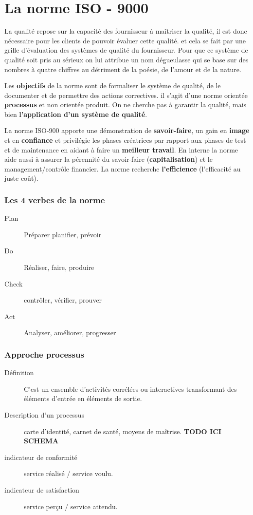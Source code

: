﻿\part{La norme ISO - 9000}

La qualité repose sur la capacité des fournisseur à maîtriser la qualité, il est donc nécessaire pour les clients de pouvoir évaluer cette qualité. et cela se fait par une grille d’évaluation des systèmes de qualité du fournisseur. Pour que ce système de qualité soit pris au sérieux on lui attribue un nom dégueulasse qui se base sur des nombres à quatre chiffres au détriment de la poésie, de l’amour et de la nature.

Les \textbf{objectifs} de la norme sont de formaliser le système de qualité, de le documenter et de permettre des  actions correctives. il s’agit d’une norme orientée \textbf{processus} et non orientée produit. On ne cherche pas à garantir la qualité, mais bien \textbf{l’application d’un système de qualité}.

La norme ISO-900 apporte une démonstration de \textbf{savoir-faire}, un gain en \textbf{image} et en \textbf{confiance} et privilégie les phases créatrices par rapport aux phases de test et de maintenance en aidant à faire un \textbf{meilleur travail}. En interne la norme aide aussi à assurer la pérennité du savoir-faire (\textbf{capitalisation}) et le management/contrôle financier. La norme recherche \textbf{l’efficience} (l'efficacité au juste coût).

\section{Les 4 verbes de la norme}
\begin{description}
	\item[Plan] Préparer planifier, prévoir
	\item[Do] Réaliser, faire, produire
	\item[Check] contrôler, vérifier, prouver
	\item[Act] Analyser, améliorer, progresser
\end{description}



\section{Approche processus}
\begin{description}
\item[Définition]C’est un ensemble d'activités corrélées ou interactives transformant des éléments d'entrée en éléments de sortie.
\item[Description d’un processus] carte d'identité, carnet de santé, moyens de maîtrise.
\textbf{TODO ICI SCHEMA}
\item[indicateur de conformité] service réalisé / service voulu.
\item[indicateur de satisfaction] service perçu / service attendu.
\end{description}

